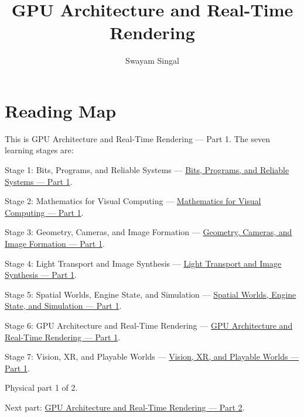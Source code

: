 \documentclass[11pt,twoside,openany]{book}
\title{GPU Architecture and Real-Time Rendering}
\author{Swayam Singal}
\begin{document}
\maketitle
\begin{center}\end{center}
\chapter*{Reading Map}
\hypertarget{volume-reading-map}{}
\noindent This is GPU Architecture and Real-Time Rendering --- Part 1. The seven learning stages are:
\par\noindent Stage 1: Bits, Programs, and Reliable Systems --- \href{../01-Bits-Programs-and-Reliable-Systems-P01/main.pdf}{Bits, Programs, and Reliable Systems — Part 1}.
\par\noindent Stage 2: Mathematics for Visual Computing --- \href{../02-Mathematics-for-Visual-Computing-P01/main.pdf}{Mathematics for Visual Computing — Part 1}.
\par\noindent Stage 3: Geometry, Cameras, and Image Formation --- \href{../03-Geometry-Cameras-and-Image-Formation-P01/main.pdf}{Geometry, Cameras, and Image Formation — Part 1}.
\par\noindent Stage 4: Light Transport and Image Synthesis --- \href{../04-Light-Transport-and-Image-Synthesis-P01/main.pdf}{Light Transport and Image Synthesis — Part 1}.
\par\noindent Stage 5: Spatial Worlds, Engine State, and Simulation --- \href{../05-Spatial-Worlds-Engine-State-and-Simulation-P01/main.pdf}{Spatial Worlds, Engine State, and Simulation — Part 1}.
\par\noindent Stage 6: GPU Architecture and Real-Time Rendering --- \href{../06-GPU-Architecture-and-Real-Time-Rendering-P01/main.pdf}{GPU Architecture and Real-Time Rendering — Part 1}.
\par\noindent Stage 7: Vision, XR, and Playable Worlds --- \href{../07-Vision-XR-and-Playable-Worlds-P01/main.pdf}{Vision, XR, and Playable Worlds — Part 1}.
\par\noindent Physical part 1 of 2.
\par\noindent Next part: \href{../06-GPU-Architecture-and-Real-Time-Rendering-P02/main.pdf}{GPU Architecture and Real-Time Rendering — Part 2}.
\tableofcontents
\mainmatter
\setcounter{chapter}{0}

\end{document}
